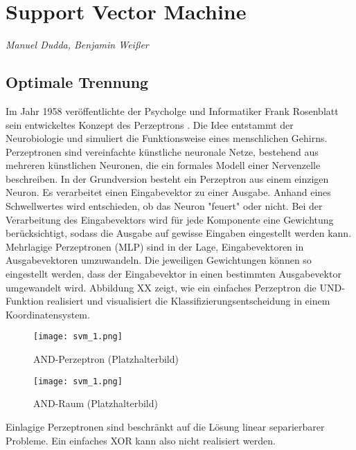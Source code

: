 \section{Support Vector Machine}
\textit{Manuel Dudda, Benjamin Weißer}

\subsection{Optimale Trennung}

Im Jahr 1958 veröffentlichte der Psycholge und Informatiker Frank Rosenblatt sein entwickeltes Konzept des Perzeptrons \cite{Rosenblatt}. 
Die Idee entstammt der Neurobiologie und simuliert die Funktionsweise eines menschlichen Gehirns. 
Perzeptronen sind vereinfachte künstliche neuronale Netze, bestehend aus mehreren künstlichen Neuronen, die ein formales Modell einer Nervenzelle beschreiben. 
In der Grundversion besteht ein Perzeptron aus einem einzigen Neuron. 
Es verarbeitet einen Eingabevektor zu einer Ausgabe. 
Anhand eines Schwellwertes wird entschieden, ob das Neuron "{}feuert"{} oder nicht. 
Bei der Verarbeitung des Eingabevektors wird für jede Komponente eine Gewichtung berücksichtigt, sodass die Ausgabe auf gewisse Eingaben eingestellt werden kann. 
Mehrlagige Perzeptronen (MLP) sind in der Lage, Eingabevektoren in Ausgabevektoren umzuwandeln. 
Die jeweiligen Gewichtungen können so eingestellt werden, dass der Eingabevektor in einen bestimmten Ausgabevektor umgewandelt wird. 
Abbildung XX zeigt, wie ein einfaches Perzeptron die UND-Funktion realisiert und visualisiert die Klassifizierungsentscheidung in einem Koordinatensystem. 

\begin{figure}[hb]
	\begin{center}
		 \texttt{[image: svm\_1.png]}
	\end{center}
	\caption{AND-Perzeptron (Platzhalterbild)}
	\label{fig:svm1}
\end{figure}

\begin{figure}[hb]
	\begin{center}
		 \texttt{[image: svm\_1.png]}
	\end{center}
	\caption{AND-Raum (Platzhalterbild)}
	\label{fig:svm1}
\end{figure}

Einlagige Perzeptronen sind beschränkt auf die Lösung linear separierbarer Probleme. 
Ein einfaches XOR kann also nicht realisiert werden.  

